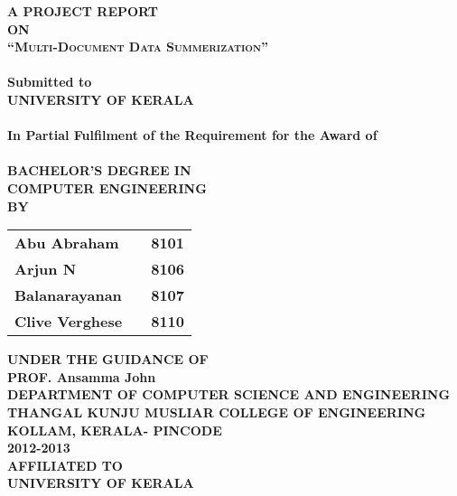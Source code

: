 \newpage
\begin{center}
\thispagestyle{empty}
\Large{\textbf{A PROJECT REPORT\\ \large{ON}}}\\[0.5cm]
\LARGE{\textsc {\textbf{``Multi-Document Data Summerization''}}}\\[0.5cm]
\vspace{0.3cm}
\Large{\textbf{\\Submitted to}}
\LARGE{\textbf{\\UNIVERSITY OF KERALA\\}}
\vspace{1cm}
\Large{\textbf{\\In Partial Fulfilment of the Requirement for the Award of\\}}
\Large{\textbf{\\BACHELOR'S DEGREE IN\\COMPUTER ENGINEERING}}
\vspace{0.5cm}
\Large{\textbf{\\BY}}\\[0.5cm]
\begin{table}[h]
\centering
\Large{
\begin{tabular}{>{\bfseries}lc>{\bfseries}r}
Abu Abraham & & 8101\\Arjun N & & 8106\\Balanarayanan & & 8107\\Clive Verghese & & 8110\\
\end{tabular}}
\end{table}
\vspace{0.5cm}
\large{\textbf{UNDER THE GUIDANCE OF}}\\
\large{\textbf{PROF. Ansamma John}}\\
\vspace{1cm}
\large{\textbf{DEPARTMENT OF COMPUTER SCIENCE AND ENGINEERING}}\\
\Large{\textbf{THANGAL KUNJU MUSLIAR COLLEGE OF ENGINEERING}}\\
\large{\textbf{KOLLAM, KERALA- PINCODE}}
\large{\textbf{\\2012-2013}}\\
\vspace{0.5cm}
\Large{\textbf{AFFILIATED TO\\}}
\LARGE{\textbf{UNIVERSITY OF KERALA}}
\newpage
\end{center}